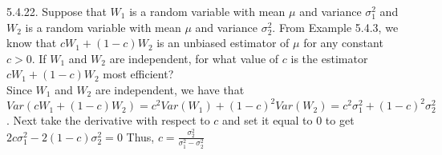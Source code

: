 \documentclass[12pt]{article}
\begin{document}
5.4.22. Suppose that $W_1$ is a random variable with mean $\mu$ and variance $\sigma^2_1$ and $W_2$ is a random variable with mean $\mu$ and variance $\sigma^2_2$. From Example 5.4.3, we know that $cW_1+(1-c)W_2$ is an unbiased estimator of $\mu$ for any constant $c>0$. If $W_1$ and $W_2$ are independent, for what value of $c$ is the estimator $cW_1+(1-c)W_2$ most efficient?\\
Since $W_1$ and $W_2$ are independent, we have that $Var(cW_1+(1-c)W_2)=c^2Var(W_1)+(1-c)^2Var(W_2)=c^2\sigma_1^2+(1-c)^2\sigma_2^2$. Next take the derivative with respect to $c$ and set it equal to $0$ to get $2c\sigma_1^2-2(1-c)\sigma_2^2=0$ Thus, $c=\frac{\sigma_2^2}{\sigma_1^2-\sigma_2^2}$
\end{document}
